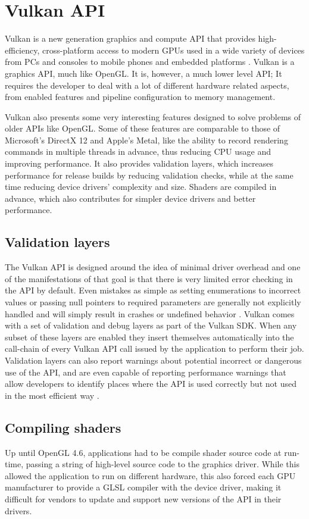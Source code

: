 \section{Vulkan API}
Vulkan is a new generation graphics and compute API that provides high-efficiency, cross-platform access to modern GPUs used in a wide variety of devices from PCs and consoles to mobile phones and embedded platforms \cite{vulkan}. Vulkan is a graphics API, much like OpenGL. It is, however, a much lower level API; It requires the developer to deal with a lot of different hardware related aspects, from enabled features and pipeline configuration to memory management.

Vulkan also presents some very interesting features designed to solve problems of older APIs like OpenGL. Some of these features are comparable to those of Microsoft's DirectX 12 and Apple's Metal, like the ability to record rendering commands in multiple threads in advance, thus reducing CPU usage and improving performance. It also provides validation layers, which increases performance for release builds by reducing validation checks, while at the same time reducing device drivers' complexity and size. Shaders are compiled in advance, which also contributes for simpler device drivers and better performance.

\subsection{Validation layers}
The Vulkan API is designed around the idea of minimal driver overhead and one of the manifestations of that goal is that there is very limited error checking in the API by default. Even mistakes as simple as setting enumerations to incorrect values or passing null pointers to required parameters are generally not explicitly handled and will simply result in crashes or undefined behavior \cite{vulkan_tutorial}. Vulkan comes with a set of validation and debug layers as part of the Vulkan SDK. When any subset of these layers are enabled they insert themselves automatically into the call-chain of every Vulkan API call issued by the application to perform their job. Validation layers can also report warnings about potential incorrect or dangerous use of the API, and are even capable of reporting performance warnings that allow developers to identify places where the API is used correctly but not used in the most efficient way \cite{vulkan_validation_layers}.

\subsection{Compiling shaders}
Up until OpenGL 4.6, applications had to be compile shader source code at run-time, passing a string of high-level source code to the graphics driver. While this allowed the application to run on different hardware, this also forced each GPU manufacturer to provide a GLSL compiler with the device driver, making it difficult for vendors to update and support new versions of the API in their drivers.

